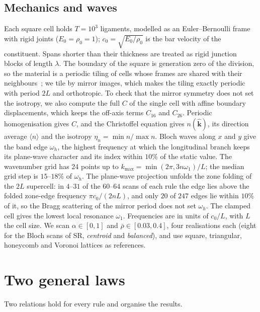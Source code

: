 \documentclass[aps,pre,twocolumn,superscriptaddress,amsmath,amssymb,floatfix]{revtex4-2}
\begin{document}
\subsection{Mechanics and waves}
Each square cell holds $T=10^3$ ligaments, modelled as an Euler--Bernoulli frame with
rigid joints ($E_0=\rho_0=1$); $c_0=\sqrt{E_0/\rho_0}$ is the bar velocity of the
constituent. Spans shorter than their thickness are treated as rigid junction blocks of
length $\lambda$. The boundary of the square is generation zero of the
division, so the material is a periodic tiling of cells whose frames are shared with their
neighbours~\cite{both2026}; we tile by mirror images, which makes the tiling exactly
periodic with period $2L$ and orthotropic. To check that the mirror symmetry does not set
the isotropy, we also compute the full $C$ of the single cell with affine boundary
displacements, which keeps the off-axis terms $C_{16}$ and $C_{26}$. Periodic homogenisation
gives $C$, and the Christoffel equation gives
$n(\hat{\bm k})$, its direction average $\langle n\rangle$ and the isotropy
$\eta_n=\min n/\max n$. Bloch waves along $x$ and $y$ give the band edge $\omega_h$, the
highest frequency at which the longitudinal branch keeps its plane-wave character and its
index within $10\%$ of the static value. The wavenumber grid has 24 points up to
$k_{\max}=\min(2\pi,3n\omega_1)/L$; the median grid step is $15$--$18\%$ of $\omega_h$. The
plane-wave projection unfolds the zone folding of the $2L$ supercell: in $4$--$31$ of the
$60$--$64$ scans of each rule the edge lies above the folded zone-edge frequency $\pi c_0/(2nL)$,
and only $20$ of $247$ edges lie within $10\%$ of it, so the Bragg scattering of the mirror
period does not set $\omega_h$. The clamped cell gives the lowest local resonance
$\omega_1$. Frequencies are in units of $c_0/L$, with $L$ the cell size. We scan
$\alpha\in[0,1]$ and $\bar\rho\in[0.03,0.4]$, four realisations each (eight for the
Bloch scans of SR, \emph{centroid} and \emph{balanced}), and use square,
triangular, honeycomb and Voronoi lattices as references.

\section{Two general laws}
\label{sec:laws}

Two relations hold for every rule and organise the results.
\end{document}
